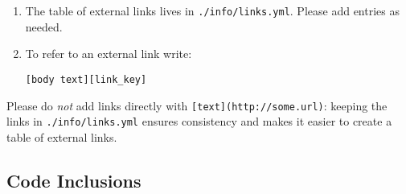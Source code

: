 \documentclass[krantzl]{krantz}
\begin{document}
\begin{enumerate}

\item 

The table of external links lives in \texttt{./info/links.yml}.
    Please add entries as needed.



\item 

To refer to an external link write:

\begin{lstlisting}[frame=single,frameround=tttt]
[body text][link_key]
\end{lstlisting}



\end{enumerate}


Please do \emph{not} add links directly with \texttt{[text](http://some.url)}:
keeping the links in \texttt{./info/links.yml} ensures consistency
and makes it easier to create a table of external links.

\subsection*{Code Inclusions}
\end{document}
